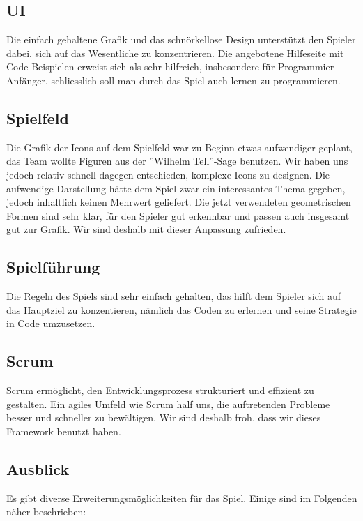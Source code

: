 \documentclass[11pt,a4paper,titlepage]{article}
\begin{document}
\subsection{UI}

Die einfach gehaltene Grafik und das schnörkellose Design unterstützt den Spieler dabei, sich auf das Wesentliche zu konzentrieren.
Die angebotene Hilfeseite mit Code-Beispielen erweist sich als sehr hilfreich, insbesondere für Programmier-Anfänger, schliesslich soll man durch das Spiel auch lernen zu programmieren.

\subsection{Spielfeld}

Die Grafik der Icons auf dem Spielfeld war zu Beginn etwas aufwendiger geplant, das Team wollte Figuren aus der ''Wilhelm Tell''-Sage benutzen. Wir haben uns jedoch relativ schnell dagegen entschieden, komplexe Icons zu designen. Die aufwendige Darstellung hätte dem Spiel zwar ein interessantes Thema gegeben, jedoch inhaltlich keinen Mehrwert geliefert. Die jetzt verwendeten geometrischen Formen sind sehr klar, für den Spieler gut erkennbar und passen auch insgesamt gut zur Grafik. Wir sind deshalb mit dieser Anpassung zufrieden.

\subsection{Spielführung}

Die Regeln des Spiels sind sehr einfach gehalten, das hilft dem Spieler sich auf das Hauptziel zu konzentieren, nämlich das Coden zu erlernen und seine Strategie in Code umzusetzen.

\subsection{Scrum}
Scrum ermöglicht, den Entwicklungsprozess strukturiert und effizient zu gestalten. Ein agiles Umfeld wie Scrum half uns, die auftretenden Probleme besser und schneller zu bewältigen. Wir sind deshalb froh, dass wir dieses Framework benutzt haben.

\subsection{Ausblick}

Es gibt diverse Erweiterungsmöglichkeiten für das Spiel. Einige sind im Folgenden näher beschrieben:
\end{document}
